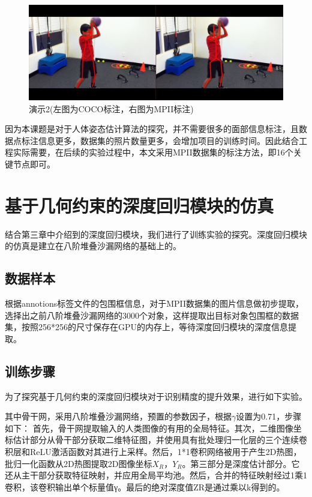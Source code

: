 \begin{figure}[h]
	\includegraphics[width=\textwidth]{pic/vs_2.jpg}
	\caption{演示2(左图为COCO标注，右图为MPII标注)}
	\label{vs_2}
\end{figure}

因为本课题是对于人体姿态估计算法的探究，并不需要很多的面部信息标注，且数据点标注信息更多，数据集的照片数量更多，会增加项目的训练时间。因此结合工程实际需要，在后续的实验过程中，本文采用MPII数据集的标注方法，即16个关键节点即可。

\section{基于几何约束的深度回归模块的仿真}

结合第三章中介绍到的深度回归模块，我们进行了训练实验的探究。深度回归模块的仿真是建立在八阶堆叠沙漏网络的基础上的。

\subsection{数据样本}

根据annotions标签文件的包围框信息，对于MPII数据集的图片信息做初步提取，选择出之前八阶堆叠沙漏网络的3000个对象，这样提取出目标对象包围框的数据集，按照256*256的尺寸保存在GPU的内存上，等待深度回归模块的深度信息提取。

\subsection{训练步骤}

为了探究基于几何约束的深度回归模块对于识别精度的提升效果，进行如下实验。

其中骨干网，采用八阶堆叠沙漏网络，预置的参数因子，根据$\gamma$设置为0.71，步骤如下：
首先，骨干网提取输入的人类图像的有用的全局特征。其次，二维图像坐标估计部分从骨干部分获取二维特征图，并使用具有批处理归一化层的三个连续卷积层和ReLU激活函数对其进行上采样。然后，1*1卷积网络被用于产生2D热图，批归一化函数从2D热图提取2D图像坐标$X_R$，$Y_R$。第三部分是深度估计部分。它还从主干部分获取特征映射，并应用全局平均池。然后，合并的特征映射经过1乘1卷积，该卷积输出单个标量值γ。最后的绝对深度值ZR是通过乘以k得到的。

